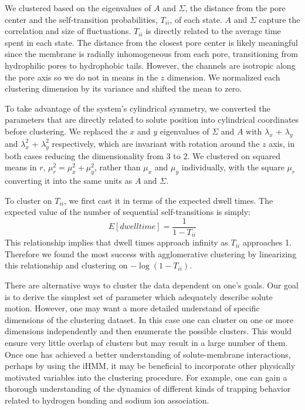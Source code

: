 \documentclass[journal=jpcbfk,manuscript=article]{achemso}
\begin{document}
  We clustered based on the eigenvalues of $A$ and $\Sigma$, the distance from the 
  pore center and the self-transition probabilities, $T_{ii}$, of each state. $A$ 
  and $\Sigma$ capture the correlation and size of fluctuations. $T_{ii}$ is directly
  related to the average time spent in each state. The distance from the closest pore 
  center is likely meaningful since the membrane is radially inhomogeneous from each 
  pore, transitioning from hydrophilic pores to hydrophobic tails. However, the 
  channels are isotropic along the pore axis so we do not in means in the $z$ dimension.
  We normalized each clustering dimension by its variance and shifted the mean to zero.
  
  To take advantage of the system's cylindrical symmetry, we converted the parameters that
  are directly related to solute position into cylindrical coordinates before clustering. 
  We replaced the $x$ and $y$ eigenvalues of $\Sigma$ and $A$ with $\lambda_x$ + 
  $\lambda_y$ and $\lambda_x^2$ + $\lambda_y^2$ respectively, which are invariant with 
  rotation around the $z$ axis, in both cases reducing the dimensionality from 3 to 2.  
  We clustered on squared means in $r$, $\mu_r^2 = \mu_x^2 + \mu_y^2$, rather than
  $\mu_x$ and $\mu_y$ individually, with the square $\mu_r$ converting it into the 
  same units as $A$ and $\Sigma$.

  To cluster on $T_{ii}$, we first cast it in terms of the expected dwell times. The expected
  value of the number of sequential self-transitions is simply:
  \begin{equation}  
   E[dwell time] = \frac{1}{1 - T_{ii}}
   \label{eqn:dwell_times}
  \end{equation}  
  This relationship implies that dwell times approach infinity as $T_{ii}$ approaches
  1. Therefore we found the most success with agglomerative clustering by linearizing this
  relationship and clustering on $-\log(1 - T_{ii})$.
  
  There are alternative ways to cluster the data dependent on one's goals. Our goal is
  to derive the simplest set of parameter which adequately describe solute motion. 
  However, one may want a more detailed understand of specific dimensions of the 
  clustering dataset. In this case one can cluster on one or more dimensions independently
  and then enumerate the possible clusters. This would ensure very little overlap of
  clusters but may result in a large number of them. Once one has achieved a better 
  understanding of solute-membrane interactions, perhaps by using the iHMM, it may be
  beneficial to incorporate other physically motivated variables into the clustering
  procedure. For example, one can gain a thorough understanding of the dynamics of
  different kinds of trapping behavior related to hydrogen bonding and sodium ion association.
 
\end{document}
